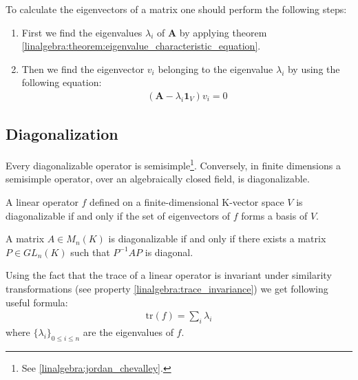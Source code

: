     \begin{method}
        To calculate the eigenvectors of a matrix one should perform the following steps:
        \begin{enumerate}
            \item First we find the eigenvalues $\lambda_i$ of $\mathbf{A}$ by applying theorem \ref{linalgebra:theorem:eigenvalue_characteristic_equation}.
                \item Then we find the eigenvector $v_i$ belonging to the eigenvalue $\lambda_i$ by using the following equation:
                    \begin{gather}
                    \label{linalgebra:eigenvectors:eigenspace}
                            \left(\mathbf{A} - \lambda_i\mathbf{1}_V\right)v_i = 0
                \end{gather}
        \end{enumerate}
    \end{method}

\subsection{Diagonalization}

        \begin{property}
            Every diagonalizable operator is semisimple\footnote{See \ref{linalgebra:jordan_chevalley}.}. Conversely, in finite dimensions a semisimple operator, over an algebraically closed field, is diagonalizable.
        \end{property}

        \begin{theorem}\label{linalgebra:theorem:diagonalizable_basis}
            A linear operator $f$ defined on a finite-dimensional K-vector space $V$ is diagonalizable if and only if the set of eigenvectors of $f$ forms a basis of $V$.
    \end{theorem}

        \begin{theorem}\label{linalgebra:theorem:diagonalizable_PQP}
        A matrix $A\in M_n(K)$ is diagonalizable if and only if there exists a matrix $P\in GL_n(K)$ such that $P^{-1}AP$ is diagonal.
        \end{theorem}
        \begin{result}
            Using the fact that the trace of a linear operator is invariant under similarity transformations (see property \ref{linalgebra:trace_invariance}) we get following useful formula:
                \begin{gather}
                    \boxed{\text{tr}(f) = \sum_i\lambda_i}
            \end{gather}
                where $\{\lambda_i\}_{0\leq i\leq n}$ are the eigenvalues of $f$.
        \end{result}

